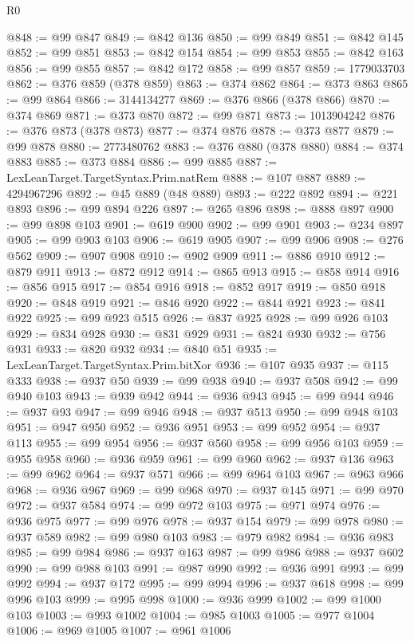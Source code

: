 \begin{lexlean}{R0}
\begin{coremodule}
@848 := @99 @847
@849 := @842 @136
@850 := @99 @849
@851 := @842 @145
@852 := @99 @851
@853 := @842 @154
@854 := @99 @853
@855 := @842 @163
@856 := @99 @855
@857 := @842 @172
@858 := @99 @857
@859 := 1779033703
@862 := @376 @859 (@378 @859)
@863 := @374 @862
@864 := @373 @863
@865 := @99 @864
@866 := 3144134277
@869 := @376 @866 (@378 @866)
@870 := @374 @869
@871 := @373 @870
@872 := @99 @871
@873 := 1013904242
@876 := @376 @873 (@378 @873)
@877 := @374 @876
@878 := @373 @877
@879 := @99 @878
@880 := 2773480762
@883 := @376 @880 (@378 @880)
@884 := @374 @883
@885 := @373 @884
@886 := @99 @885
@887 := LexLeanTarget.TargetSyntax.Prim.natRem
@888 := @107 @887
@889 := 4294967296
@892 := @45 @889 (@48 @889)
@893 := @222 @892
@894 := @221 @893
@896 := @99 @894 @226
@897 := @265 @896
@898 := @888 @897
@900 := @99 @898 @103
@901 := @619 @900
@902 := @99 @901
@903 := @234 @897
@905 := @99 @903 @103
@906 := @619 @905
@907 := @99 @906
@908 := @276 @562
@909 := @907 @908
@910 := @902 @909
@911 := @886 @910
@912 := @879 @911
@913 := @872 @912
@914 := @865 @913
@915 := @858 @914
@916 := @856 @915
@917 := @854 @916
@918 := @852 @917
@919 := @850 @918
@920 := @848 @919
@921 := @846 @920
@922 := @844 @921
@923 := @841 @922
@925 := @99 @923 @515
@926 := @837 @925
@928 := @99 @926 @103
@929 := @834 @928
@930 := @831 @929
@931 := @824 @930
@932 := @756 @931
@933 := @820 @932
@934 := @840 @51
@935 := LexLeanTarget.TargetSyntax.Prim.bitXor
@936 := @107 @935
@937 := @115 @333
@938 := @937 @50
@939 := @99 @938
@940 := @937 @508
@942 := @99 @940 @103
@943 := @939 @942
@944 := @936 @943
@945 := @99 @944
@946 := @937 @93
@947 := @99 @946
@948 := @937 @513
@950 := @99 @948 @103
@951 := @947 @950
@952 := @936 @951
@953 := @99 @952
@954 := @937 @113
@955 := @99 @954
@956 := @937 @560
@958 := @99 @956 @103
@959 := @955 @958
@960 := @936 @959
@961 := @99 @960
@962 := @937 @136
@963 := @99 @962
@964 := @937 @571
@966 := @99 @964 @103
@967 := @963 @966
@968 := @936 @967
@969 := @99 @968
@970 := @937 @145
@971 := @99 @970
@972 := @937 @584
@974 := @99 @972 @103
@975 := @971 @974
@976 := @936 @975
@977 := @99 @976
@978 := @937 @154
@979 := @99 @978
@980 := @937 @589
@982 := @99 @980 @103
@983 := @979 @982
@984 := @936 @983
@985 := @99 @984
@986 := @937 @163
@987 := @99 @986
@988 := @937 @602
@990 := @99 @988 @103
@991 := @987 @990
@992 := @936 @991
@993 := @99 @992
@994 := @937 @172
@995 := @99 @994
@996 := @937 @618
@998 := @99 @996 @103
@999 := @995 @998
@1000 := @936 @999
@1002 := @99 @1000 @103
@1003 := @993 @1002
@1004 := @985 @1003
@1005 := @977 @1004
@1006 := @969 @1005
@1007 := @961 @1006

\end{coremodule}
\end{lexlean}
